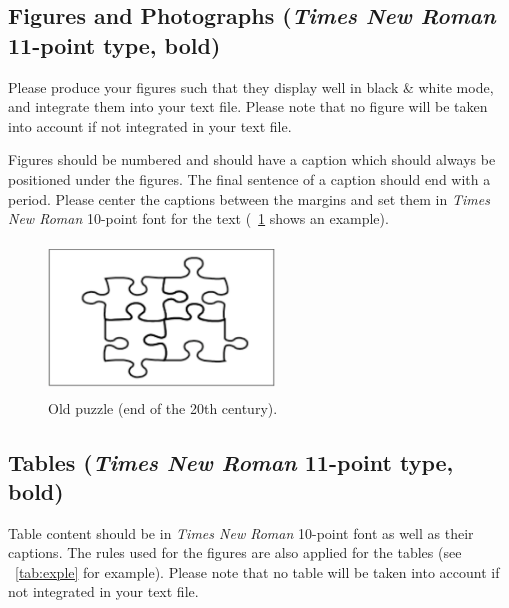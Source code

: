 \documentclass[long, final]{jobim2017}
\begin{document}
\subsection{Figures and Photographs (\emph{Times New Roman} 11-point type, bold)}
\label{sec:figures-photographs}

Please produce your figures such that they display well in black \& white
mode, and integrate them into your text file. Please note that no figure will
be taken into account if not integrated in your text file.

Figures should be numbered and should have a
caption which should always be positioned under the figures. The final
sentence of a caption should end with a period. Please center the captions
between the margins and set them in
\emph{Times New Roman} 10-point font for the text (\figurename~\ref{fig:puzzle} shows an
example).

 \begin{figure}
   \begin{center}
     \setlength{\unitlength}{5mm}
     \includegraphics[height=4cm,width=6cm]{figs/fig1}
   \end{center}
   \caption{Old \jobim puzzle (end of the 20th century).}
   \label{fig:puzzle}
 \end{figure}

\subsection{Tables (\emph{Times New Roman} 11-point type, bold)}
\label{sec:tables}

Table content should be in \emph{Times New Roman} 10-point font as well as their
captions. The rules used for the figures are also applied for the tables
(see \tablename~\ref{tab:exple} for example). Please note that no table will be
taken into account if not integrated in your text file.
\end{document}
